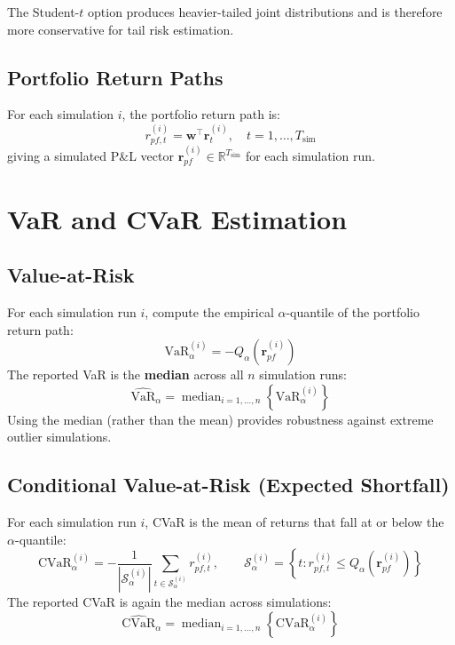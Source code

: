 \documentclass[11pt, a4paper]{article}
\begin{document}
The Student-$t$ option produces heavier-tailed joint distributions and
is therefore more conservative for tail risk estimation.

\subsection{Portfolio Return Paths}

For each simulation $i$, the portfolio return path is:
\begin{equation}
r_{pf,t}^{(i)} = \mathbf{w}^\top \mathbf{r}_t^{(i)}, \quad t = 1,\ldots, T_{\text{sim}}
\end{equation}
giving a simulated P\&L vector $\mathbf{r}_{pf}^{(i)} \in \mathbb{R}^{T_{\text{sim}}}$
for each simulation run.

\section{VaR and CVaR Estimation}

\subsection{Value-at-Risk}

For each simulation run $i$, compute the empirical $\alpha$-quantile of
the portfolio return path:
\begin{equation}
\text{VaR}_\alpha^{(i)} = -Q_\alpha\!\left(\mathbf{r}_{pf}^{(i)}\right)
\end{equation}
The reported VaR is the \textbf{median} across all $n$ simulation runs:
\begin{equation}
\widehat{\text{VaR}}_\alpha
= \operatorname{median}_{i=1,\ldots,n}\!\left\{\text{VaR}_\alpha^{(i)}\right\}
\label{eq:mc_var}
\end{equation}
Using the median (rather than the mean) provides robustness against
extreme outlier simulations.

\subsection{Conditional Value-at-Risk (Expected Shortfall)}

For each simulation run $i$, CVaR is the mean of returns that fall at or
below the $\alpha$-quantile:
\begin{equation}
\text{CVaR}_\alpha^{(i)}
= -\frac{1}{|\mathcal{S}_\alpha^{(i)}|}
  \sum_{t \in \mathcal{S}_\alpha^{(i)}} r_{pf,t}^{(i)},
\qquad
\mathcal{S}_\alpha^{(i)} = \left\{t : r_{pf,t}^{(i)} \leq Q_\alpha\!\left(\mathbf{r}_{pf}^{(i)}\right)\right\}
\end{equation}
The reported CVaR is again the median across simulations:
\begin{equation}
\widehat{\text{CVaR}}_\alpha
= \operatorname{median}_{i=1,\ldots,n}\!\left\{\text{CVaR}_\alpha^{(i)}\right\}
\label{eq:mc_cvar}
\end{equation}
\end{document}
